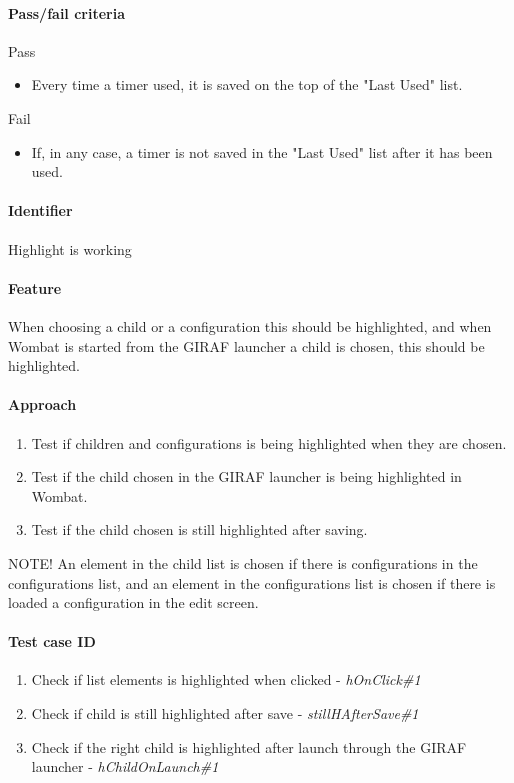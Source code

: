 \paragraph{Pass/fail criteria}
	Pass
	\begin{itemize}
		\item Every time a timer used, it is saved on the top of the "Last Used" list.
	\end{itemize}
	Fail
	\begin{itemize}
		\item If, in any case, a timer is not saved in the "Last Used" list after it has been used.
	\end{itemize}

\clearpage
\paragraph{Identifier}
	Highlight is working
\paragraph{Feature}
	When choosing a child or a configuration this should be highlighted, and when Wombat is started from the GIRAF launcher a child is chosen, this should be highlighted.
\paragraph{Approach}
	\begin{enumerate} 
		\item Test if children and configurations is being highlighted when they are chosen.
		\item Test if the child chosen in the GIRAF launcher is being highlighted in Wombat.
		\item Test if the child chosen is still highlighted after saving.
	\end{enumerate}
	NOTE! An element in the child list is chosen if there is configurations in the configurations list, and an element in the configurations list is chosen if there is loaded a configuration in the edit screen.
\paragraph{Test case ID}
	\begin{enumerate}
		\item Check if list elements is highlighted when clicked - \textit{hOnClick\#1}
		\item Check if child is still highlighted after save - \textit{stillHAfterSave\#1}
		\item Check if the right child is highlighted after launch through the GIRAF launcher - \textit{hChildOnLaunch\#1}
	\end{enumerate}
